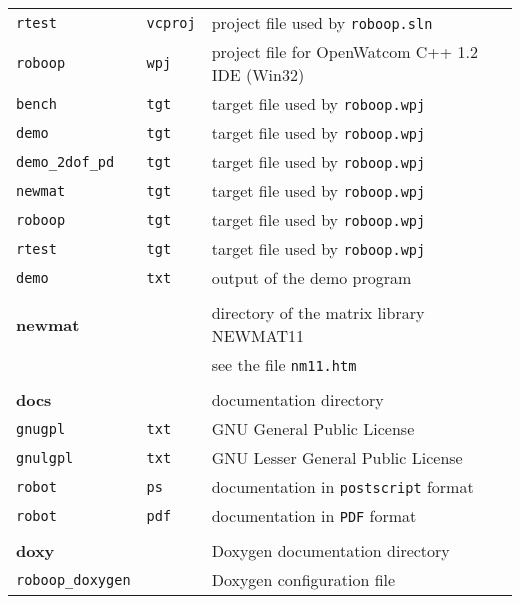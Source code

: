 \documentclass[dvips,11pt,fleqn]{report}
\begin{document}
{\begin{tabular}{lll}
{\tt rtest} & {\tt vcproj} & project file used by \texttt{roboop.sln} \\
{\tt roboop} & {\tt wpj} & project file for OpenWatcom C++ 1.2 IDE (Win32) \\
{\tt bench} & {\tt tgt} & target file used by \texttt{roboop.wpj} \\
{\tt demo} & {\tt tgt} & target file used by \texttt{roboop.wpj} \\
{\tt demo\_2dof\_pd} & {\tt tgt} & target file used by \texttt{roboop.wpj} \\
{\tt newmat} & {\tt tgt} & target file used by \texttt{roboop.wpj} \\
{\tt roboop} & {\tt tgt} & target file used by \texttt{roboop.wpj} \\
{\tt rtest} & {\tt tgt} & target file used by \texttt{roboop.wpj} \\
{\tt demo} & {\tt txt} & output of the demo program \\ \\
{\bf newmat} & & directory of the matrix library \textsf{NEWMAT11} \\
& & see the file {\tt nm11.htm} \\ \\
{\bf docs} & & documentation directory \\
{\tt gnugpl} & {\tt txt} & GNU General Public License \\
{\tt gnulgpl} & {\tt txt} & GNU Lesser General Public License \\
{\tt robot} & {\tt ps} & documentation in {\tt postscript} format \\
{\tt robot} & {\tt pdf} & documentation in {\tt PDF} format \\ \\
{\bf doxy} & & \textsf{Doxygen} documentation directory \\
\texttt{roboop\_doxygen} & & \textsf{Doxygen} configuration file
\end{tabular}

}
\end{document}
